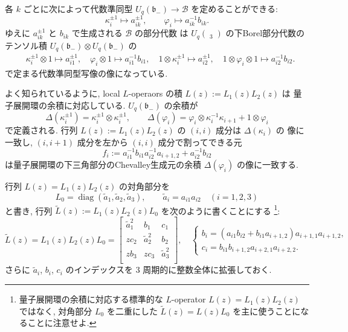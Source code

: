 \documentclass[12pt,twoside,dvipdfm]{msjproc}
\theoremstyle{definition} %
\theoremstyle{definition} %
\theoremstyle{definition} %
\numberwithin{theorem}{section}
\numberwithin{equation}{section}
\numberwithin{figure}{section}
\numberwithin{table}{section}
\newcommand\bor{\mathfrak{b}}
\newcommand\B{\mathcal{B}}
\newcommand\diag{\mathop{\mathrm{diag}}\nolimits}
\newcommand\glhat{\mathop{\widehat{\mathrm{gl}}}\nolimits}
\newcommand\tL{{\widetilde{L}}}
\newcommand\ta{{\tilde{a}}}
\begin{document}
各 $k$ ごとに次によって代数準同型 $U_q(\bor_-)\to\B$ を定めることができる:
\begin{equation*}
  \kappa_i^{\pm1}\mapsto a_{ik}^{\pm1},  \qquad
  \varphi_i \mapsto a_{ik}^{-1} b_{ik}.
\end{equation*}
ゆえに $a_{ik}^{\pm 1}$ と $b_{ik}$ で生成される $\B$ の部分代数
は $U_q(\glhat_3)$ の下Borel部分代数の
テンソル積 $U_q(\bor_-)\otimes U_q(\bor_-)$ の
\begin{align*}
  &
  \kappa_i^{\pm1}\otimes 1 \mapsto a_{i1}^{\pm1},  \quad
  \varphi_i\otimes 1 \mapsto a_{i1}^{-1} b_{i1},
\quad
  1\otimes \kappa_i^{\pm1} \mapsto a_{i2}^{\pm1},  \quad
  1\otimes\varphi_i\otimes 1 \mapsto a_{i2}^{-1} b_{i2}.
\end{align*}
で定まる代数準同型写像の像になっている.

よく知られているように, local $L$-operaors の積 $L(z):=L_1(z)L_2(z)$ は
量子展開環の余積に対応している.
$U_q(\bor_-)$ の余積が
\begin{equation*}
  \Delta(\kappa_i^{\pm1}) = \kappa_i^{\pm1}\otimes\kappa_i^{\pm1}, \qquad
  \Delta(\varphi_i) 
  = \varphi_i\otimes \kappa_i^{-1}\kappa_{i+1} + 1\otimes\varphi_i
\end{equation*}
で定義される. 行列 $L(z):=L_1(z)L_2(z)$ の $(i,i)$ 成分は $\Delta(\kappa_i)$ の
像に一致し, $(i,i+1)$ 成分を左から $(i,i)$ 成分で割ってできる元
\begin{equation*}
  f_i := a_{i1}^{-1}b_{i1}a_{i2}^{-1}a_{i+1,2} + a_{i2}^{-1}b_{i2}
\end{equation*}
は量子展開環の下三角部分のChevalley生成元の余積 $\Delta(\varphi_i)$ の像に一致する.
	


行列 $L(z) = L_1(z)L_2(z)$ の対角部分を
\begin{equation*}
  L_0=\diag(\ta_1,\ta_2,\ta_3), \qquad
  \ta_i = a_{i1}a_{i2} \quad (i=1,2,3)
\end{equation*}
と書き, 行列 $\tL(z) := L_1(z)L_2(z)L_0$ を次のように書くことにする%
\footnote{量子展開環の余積に対応する標準的な $L$-operator $L(z)=L_1(z)L_2(z)$ ではなく, 
対角部分 $L_0$ を二重にした $\tL(z)=L(z)L_0$ を主に使うことになることに注意せよ.}:
\begin{equation*}
 \tL(z) = L_1(z)L_2(z)L_0 =
 \begin{bmatrix}
     \ta_1^2 & b_1     & c_1 \\
   z c_2     & \ta_2^2 & b_2 \\
   z b_3     & z c_3   & \ta_3^2 \\
 \end{bmatrix},
 \quad
 \begin{cases}
  b_i = (a_{i1}b_{i2}+b_{i1}a_{i+1,2})a_{i+1,1}a_{i+1,2}, \\
  c_i = b_{i1}b_{i+1,2}a_{i+2,1}a_{i+2,2}.
 \end{cases}
\end{equation*}
さらに $\ta_i$, $b_i$, $c_i$ のインデックスを $3$ 周期的に整数全体に拡張しておく.
\end{document}
